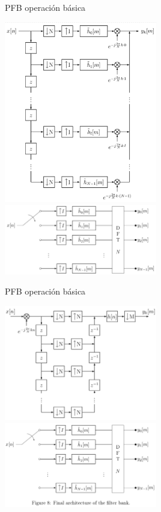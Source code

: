 \documentclass[ignorenonframetext,12pt]{beamer}
\begin{document}
\begin{frame}{PFB operación básica}
        \begin{center}
                \includegraphics[width=0.5\textwidth]{PFB_distribution_modulators}\\
                \includegraphics[width=0.5\textwidth]{PFB_final_arquitecture}
        \end{center}
\end{frame}

\begin{frame}{PFB operación básica}
        \begin{center}
                \includegraphics[width=0.5\textwidth]{PFB_opening_after_modulation}\\
                \includegraphics[width=0.5\textwidth]{PFB_OVS_final_architecture}
        \end{center}
\end{frame}
\end{document}
